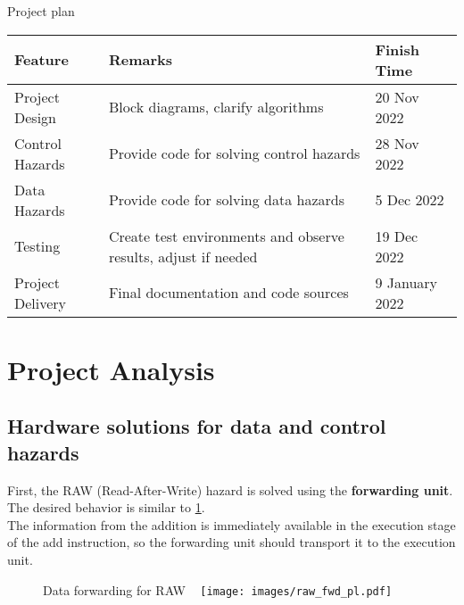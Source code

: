 \documentclass[a4paper,12pt]{report}
\begin{document}
\begin{my-table}{Project plan}
        \begin{center}
                \begin{tabular}{| m{3cm} | m{9cm}| m{3cm} |}
                \hline
                \textbf{Feature} &  \textbf{Remarks} & \textbf{Finish Time}\\
                 \hline
                Project Design & Block diagrams, clarify algorithms & 20 Nov 2022\\
                 \hline
                Control Hazards & Provide code for solving control hazards & 28 Nov 2022\\
                \hline
                Data Hazards & Provide code for solving data hazards &  5 Dec 2022 \\
                \hline
                Testing & Create test environments and observe results, adjust if needed & 19 Dec 2022 \\
                \hline
                Project Delivery & Final documentation and code sources & 9 January 2022 \\
                \hline
            \end{tabular}
    \end{center}
\end{my-table}

\section{Project Analysis}
\subsection{Hardware solutions for data and control hazards}
First, the RAW (Read-After-Write) hazard is solved using the \textbf{forwarding unit}. The desired behavior is similar to \ref{fig:RAW_fwd}. \\
The information from the addition is immediately available in the execution stage of the add instruction, so the forwarding unit should transport it to the execution unit.

\begin{figure}[h]
    \begin{my-figure}{Data forwarding for RAW ~\cite{patterson2014computer}}
            \centering
            \texttt{[image: images/raw\_fwd\_pl.pdf]}
            \label{fig:RAW_fwd}
    \end{my-figure}
\end{figure}
\end{document}
